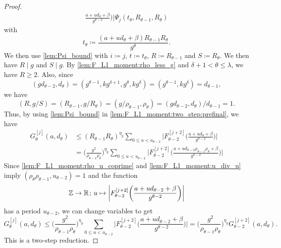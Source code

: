 \documentclass[hidelinks]{amsart}
\numberwithin{equation}{section}
\theoremstyle{plain}
\theoremstyle{definition}
\newcommand{\semicolon}{\nobreak\mskip2mu\mathpunct{}\nonscript
\mkern-\thinmuskip{;}\mskip6muplus1mu\relax}
\begin{document}
\begin{proof}
\begin{equation}
\begin{aligned}
\frac{a+ud_{\theta}+\beta}{g^{\theta-2}}
\biggr)\biggr|
\Psi_{j}(t_{\theta},R_{\theta-1},R_{\theta})
\end{aligned}
\end{equation}
with
\[
t_{\theta}
\coloneqq
\frac{(a+ud_{\theta}+\beta)R_{\theta-1}R_{\theta}}{g^{\theta}}.
\]
We then use \cref{lem:Psi_bound} with
$i\coloneqq j$, $t\coloneqq t_{\theta}$,
$R\coloneqq R_{\theta-1}$ and $S\coloneqq R_{\theta}$.
We then have $R\mid g$ and $S\mid g$.
By \cref{lem:F_L1_moment:rho_less_g} and $\delta+1<\theta\le\lambda$,
we have $R\ge 2$. Also, since
\[
(gd_{\theta-2},d_{\theta})
=
(g^{\theta-1},kg^{\delta+1},g^{\theta},kg^{\delta})
=
(g^{\theta-1},kg^{\delta})
=
d_{\theta-1},
\]
we have
\[
(R,g/S)
=(R_{\theta-1},g/R_{\theta})
=(g/\rho_{\theta-1},\rho_{\theta})
=(gd_{\theta-2},d_{\theta})/d_{\theta-1}
=
1.
\]
Thus, by using \cref{lem:Psi_bound} in \cref{lem:F_L1_moment:two_step:prefinal}, we have
\begin{align}
G_{\theta}^{[j]}(a,d_{\theta})
&\le
(R_{\theta-1}R_{\theta})^{\eta_{g}}
\sum_{0\le u<u_{\theta-2}}
\biggl|F_{\theta-2}^{[j+2]}\biggl(
\frac{a+ud_{\theta}+\beta}{g^{\theta-2}}
\biggr)\biggr|\\
&=
\biggl(\frac{g^{2}}{\rho_{\theta-1}\rho_{\theta}}\biggr)^{\eta_{g}}
\sum_{0\le u<u_{\theta-2}}
\biggl|F_{\theta-2}^{[j+2]}\biggl(
\frac{a+ud_{\theta-2}\rho_{\theta-1}\rho_{\theta}+\beta}{g^{\theta-2}}
\biggr)\biggr|
\end{align}
Since \cref{lem:F_L1_moment:rho_u_coprime}
and \cref{lem:F_L1_moment:u_div_u}
imply $(\rho_{\theta}\rho_{\theta-1},u_{\theta-2})=1$
and the function
\[
\mathbb{Z}\to\mathbb{R}
\semicolon
u
\mapsto
\biggl|F_{\theta-2}^{[j+2]}\biggl(
\frac{a+ud_{\theta-2}+\beta}{g^{\theta-2}}
\biggr)\biggr|
\]
has a period $u_{\theta-2}$, we can change variables to get
\begin{equation}
\label{lem:F_L1_moment:two_step}
G_{\theta}^{[j]}(a,d_{\theta})
\le
\biggl(\frac{g^{2}}{\rho_{\theta-1}\rho_{\theta}}\biggr)^{\eta_{g}}
\sum_{0\le u<u_{\theta-2}}
\biggl|F_{\theta-2}^{[j+2]}\biggl(
\frac{a+ud_{\theta-2}+\beta}{g^{\theta-2}}
\biggr)\biggr|
=
\biggl(\frac{g^{2}}{\rho_{\theta-1}\rho_{\theta}}\biggr)^{\eta_{g}}
G_{\theta-2}^{[j+2]}(a,d_{\theta}).
\end{equation}
This is a two-step reduction.


\end{proof}
\end{document}
